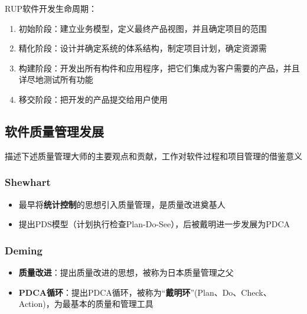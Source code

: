 RUP软件开发生命周期：
\begin{enumerate}[label=\arabic*.]
    \item 初始阶段：建立业务模型，定义最终产品视图，并且确定项目的范围
    \item 精化阶段：设计并确定系统的体系结构，制定项目计划，确定资源需
    \item 构建阶段：开发出所有构件和应用程序，把它们集成为客户需要的产品，并且详尽地测试所有功能
    \item 移交阶段：把开发的产品提交给用户使用
\end{enumerate}

\subsection{软件质量管理发展}
\begin{problem}
描述下述质量管理大师的主要观点和贡献，工作对软件过程和项目管理的借鉴意义
\end{problem}

\subsubsection{Shewhart}
\begin{itemize}
    \item 最早将\textbf{统计控制}的思想引入质量管理，是质量改进奠基人
    \item 提出PDS模型（计划执行检查Plan-Do-See），后被戴明进一步发展为PDCA
\end{itemize}

\subsubsection{Deming}
\begin{itemize}
    \item \textbf{质量改进}：提出质量改进的思想，被称为日本质量管理之父
    \item \textbf{PDCA循环}：提出PDCA循环，被称为“\textbf{戴明环}”(Plan、Do、Check、Action)，为最基本的质量和管理工具
\end{itemize}


